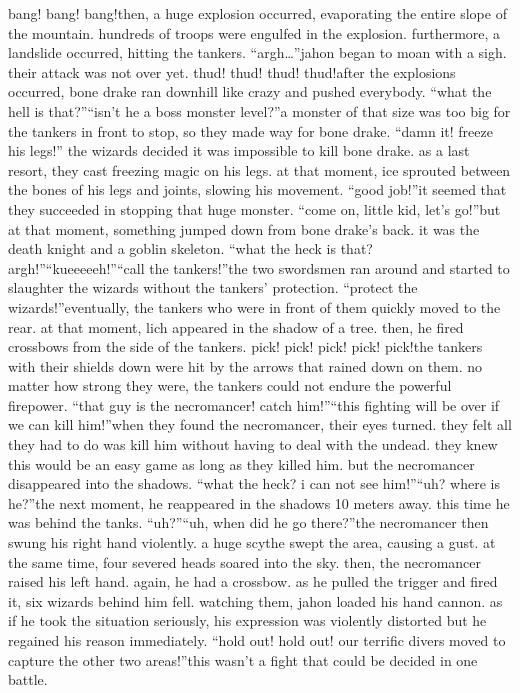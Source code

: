 bang! bang! bang!then, a huge explosion occurred, evaporating the entire slope of the mountain.
hundreds of troops were engulfed in the explosion.
 furthermore, a landslide occurred, hitting the tankers.
“argh…”jahon began to moan with a sigh.
 their attack was not over yet.
thud! thud! thud! thud!after the explosions occurred, bone drake ran downhill like crazy and pushed everybody.
“what the hell is that?”“isn’t he a boss monster level?”a monster of that size was too big for the tankers in front to stop, so they made way for bone drake.
“damn it! freeze his legs!”
the wizards decided it was impossible to kill bone drake.
 as a last resort, they cast freezing magic on his legs.
 at that moment, ice sprouted between the bones of his legs and joints, slowing his movement.
“good job!”it seemed that they succeeded in stopping that huge monster.
“come on, little kid, let’s go!”but at that moment, something jumped down from bone drake’s back.
 it was the death knight and a goblin skeleton.
“what the heck is that? argh!”“kueeeeeh!”“call the tankers!”the two swordsmen ran around and started to slaughter the wizards without the tankers’ protection.
“protect the wizards!”eventually, the tankers who were in front of them quickly moved to the rear.
at that moment, lich appeared in the shadow of a tree.
 then, he fired crossbows from the side of the tankers.
pick! pick! pick! pick! pick!the tankers with their shields down were hit by the arrows that rained down on them.
 no matter how strong they were, the tankers could not endure the powerful firepower.
“that guy is the necromancer! catch him!”“this fighting will be over if we can kill him!”when they found the necromancer, their eyes turned.
 they felt all they had to do was kill him without having to deal with the undead.
 they knew this would be an easy game as long as they killed him.
but the necromancer disappeared into the shadows.
“what the heck? i can not see him!”“uh? where is he?”the next moment, he reappeared in the shadows 10 meters away.
 this time he was behind the tanks.
“uh?”“uh, when did he go there?”the necromancer then swung his right hand violently.
 a huge scythe swept the area, causing a gust.
 at the same time, four severed heads soared into the sky.
then, the necromancer raised his left hand.
 again, he had a crossbow.
 as he pulled the trigger and fired it, six wizards behind him fell.
watching them, jahon loaded his hand cannon.
 as if he took the situation seriously, his expression was violently distorted but he regained his reason immediately.
“hold out! hold out! our terrific divers moved to capture the other two areas!”this wasn’t a fight that could be decided in one battle.
